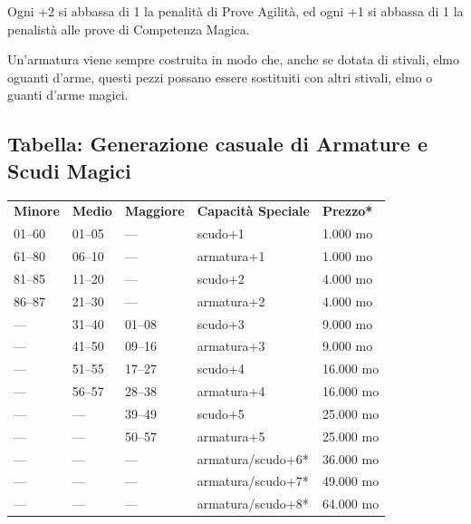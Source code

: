 \documentclass[a4paper,11pt,twoside,openany]{book}
\begin{document}
Ogni +2 si abbassa di 1 la penalità di Prove Agilità, ed ogni +1 si abbassa di 1 la penalistà alle prove di Competenza Magica.

Un'armatura viene sempre costruita in modo che, anche se dotata di stivali, elmo oguanti d'arme, questi pezzi possano essere sostituiti con altri stivali, elmo o guanti d'arme magici.


\subsection{Tabella: Generazione casuale di Armature e Scudi Magici}

\label{tabella-generazione-casuale-di-armature-e-scudi-magici}

\begin{tabularx}{0.95\textwidth}{XXXXX}
	\toprule
	\textbf{Minore} & \textbf{Medio} & \textbf{Maggiore} & \textbf{Capacità Speciale}        & \textbf{Prezzo{*}}\\
	01--60          & 01--05         & ---               & scudo+1           & 1.000 mo\\
	61--80          & 06--10         & ---               & armatura+1        & 1.000 mo\\
	81--85          & 11--20         & ---               & scudo+2           & 4.000 mo\\
	86--87          & 21--30         & ---               & armatura+2        & 4.000 mo\\
	---             & 31--40         & 01--08            & scudo+3           & 9.000 mo\\
	---             & 41--50         & 09--16            & armatura+3        & 9.000 mo\\
	---             & 51--55         & 17--27            & scudo+4           & 16.000 mo\\
	---             & 56--57         & 28--38            & armatura+4        & 16.000 mo\\
	---             & ---            & 39--49            & scudo+5           & 25.000 mo\\
	---             & ---            & 50--57            & armatura+5        & 25.000 mo\\
	---             & ---            & ---               & armatura/scudo+6{*}               & 36.000 mo\\
	---             & ---            & ---               & armatura/scudo+7{*}               & 49.000 mo\\
	---             & ---            & ---               & armatura/scudo+8{*}               & 64.000 mo\\

\end{tabularx}
\end{document}
